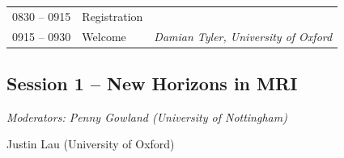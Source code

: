 \documentclass[a5paper,10pt,twoside,onecolumn,openany,helvetica,showtrims]{memoir}
\newlength{\JackBoxOne}
\newlength{\JackBoxTwo}
\newlength{\JackBoxThree}
\newcommand{\talkauthor}[1]{\small\emph{#1}}
\begin{document}
\noindent\hspace{-0.75em}\begin{tabular}{p{\JackBoxOne}p{\JackBoxTwo}p{\JackBoxThree}}
0830 -- 0915 & Registration & \\ 
0915 -- 0930 & Welcome & \talkauthor{Damian Tyler, University of Oxford} \\	 	
\end{tabular}
\subsection*{Session 1 -- New Horizons in MRI}
\begin{flushright}
\itshape Moderators: Penny Gowland (University of Nottingham) 

Justin Lau (University of Oxford)
\end{flushright}
\end{document}
